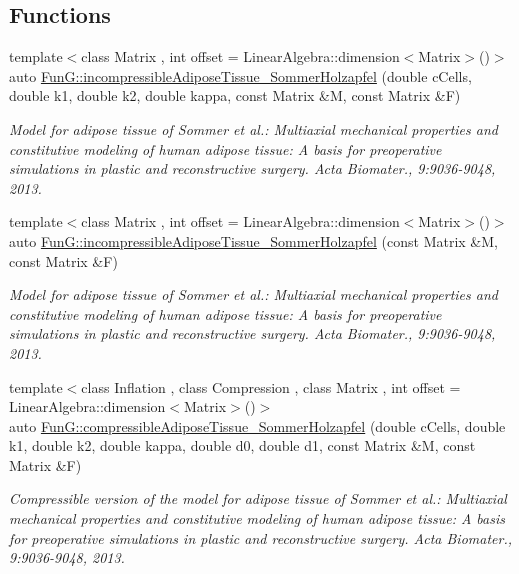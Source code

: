 \subsection*{Functions}
\begin{DoxyCompactItemize}
\item 
{\footnotesize template$<$class Matrix , int offset = Linear\-Algebra\-::dimension$<$\-Matrix$>$()$>$ }\\auto \hyperlink{group__Biomechanics_gac269eefc1abb994044e1634c20a98061}{Fun\-G\-::incompressible\-Adipose\-Tissue\-\_\-\-Sommer\-Holzapfel} (double c\-Cells, double k1, double k2, double kappa, const Matrix \&M, const Matrix \&F)
\begin{DoxyCompactList}\small\item\em Model for adipose tissue of Sommer et al.\-: Multiaxial mechanical properties and constitutive modeling of human adipose tissue\-: A basis for preoperative simulations in plastic and reconstructive surgery. Acta Biomater., 9\-:9036-\/9048, 2013. \end{DoxyCompactList}\item 
{\footnotesize template$<$class Matrix , int offset = Linear\-Algebra\-::dimension$<$\-Matrix$>$()$>$ }\\auto \hyperlink{group__Biomechanics_ga01ab128bcf179f4431b0270179af9e20}{Fun\-G\-::incompressible\-Adipose\-Tissue\-\_\-\-Sommer\-Holzapfel} (const Matrix \&M, const Matrix \&F)
\begin{DoxyCompactList}\small\item\em Model for adipose tissue of Sommer et al.\-: Multiaxial mechanical properties and constitutive modeling of human adipose tissue\-: A basis for preoperative simulations in plastic and reconstructive surgery. Acta Biomater., 9\-:9036-\/9048, 2013. \end{DoxyCompactList}\item 
{\footnotesize template$<$class Inflation , class Compression , class Matrix , int offset = Linear\-Algebra\-::dimension$<$\-Matrix$>$()$>$ }\\auto \hyperlink{group__Biomechanics_ga5c3388564c0420b62e58f48c739d27f1}{Fun\-G\-::compressible\-Adipose\-Tissue\-\_\-\-Sommer\-Holzapfel} (double c\-Cells, double k1, double k2, double kappa, double d0, double d1, const Matrix \&M, const Matrix \&F)
\begin{DoxyCompactList}\small\item\em Compressible version of the model for adipose tissue of Sommer et al.\-: Multiaxial mechanical properties and constitutive modeling of human adipose tissue\-: A basis for preoperative simulations in plastic and reconstructive surgery. Acta Biomater., 9\-:9036-\/9048, 2013. \end{DoxyCompactList}\item 

\end{DoxyCompactItemize}
